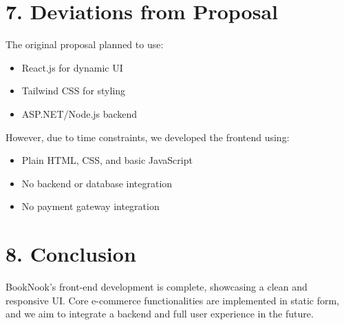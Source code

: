 \documentclass[12pt]{article}
\begin{document}
\section*{7. Deviations from Proposal}
The original proposal planned to use:
\begin{itemize}
    \item React.js for dynamic UI
    \item Tailwind CSS for styling
    \item ASP.NET/Node.js backend
\end{itemize}

However, due to time constraints, we developed the frontend using:
\begin{itemize}
    \item Plain HTML, CSS, and basic JavaScript
    \item No backend or database integration
    \item No payment gateway integration
\end{itemize}

\section*{8. Conclusion}
BookNook's front-end development is complete, showcasing a clean and responsive UI. Core e-commerce functionalities are implemented in static form, and we aim to integrate a backend and full user experience in the future.
\end{document}
